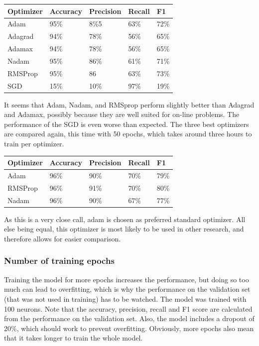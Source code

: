 \documentclass[
	a4paper,
	pagesize,
	pdftex,
	12pt,
	twoside, %
	BCOR=5mm, %
	ngerman,
	fleqn,
	final,
	]{scrartcl}
\begin{document}
\begin{tabular}{ | p{3cm} || p{2cm}|p{2cm}|p{2cm}|p{2cm}|  }
	\hline
	\textbf{Optimizer} & \textbf{Accuracy} & \textbf{Precision} & \textbf{Recall} & \textbf{F1} \\
	\hline
	Adam & 95\% &  8\%5 &  63\% &  72\% \\  
	Adagrad & 94\% &  78\% &  56\% &  65\% \\ 
	Adamax & 94\% &  78\% &  56\% &  65\% \\ 
	Nadam & 95\% &  86\% &  61\% &  71\% \\ 
	RMSProp & 95\% &  86 &  63\% &  73\% \\ 
	SGD & 15\% &  10\% &  97\% & 19\% \\
	\hline
	\hline
\end{tabular}

It seems that Adam, Nadam, and RMSprop perform slightly better than Adagrad and Adamax, possibly because they are well suited for on-line problems. The performance of the SGD is even worse than expected. The three best optimizers are compared again, this time with 50 epochs, which takes around three hours to train per optimizer.

\begin{tabular}{ | p{3cm} || p{2cm}|p{2cm}|p{2cm}|p{2cm}|  }
	\hline
	\textbf{Optimizer} & \textbf{Accuracy} & \textbf{Precision} & \textbf{Recall} & \textbf{F1} \\
	\hline
	Adam & 96\%& 90\%& 70\%& 79\% \\
	RMSProp & 96\% &  91\% &  70\% &  80\% \\ 
	Nadam & 96\% & 90\% & 67\% & 77\%\\
	\hline
	\hline
\end{tabular}

As this is a very close call, adam is chosen as preferred standard optimizer. All else being equal, this optimizer is most likely to be used in other research, and therefore allows for easier comparison.

\subsubsection{Number of training epochs}
Training the model for more epochs increases the performance, but doing so too much can lead to overfitting, which is why the performance on the validation set (that was not used in training) has to be watched. The model was trained with 100 neurons. Note that the accuracy, precision, recall and F1 score are calculated from the performance on the validation set. Also, the model includes a dropout of 20\%, which should work to prevent overfitting. Obviously, more epochs also mean that it takes longer to train the whole model.
\end{document}
